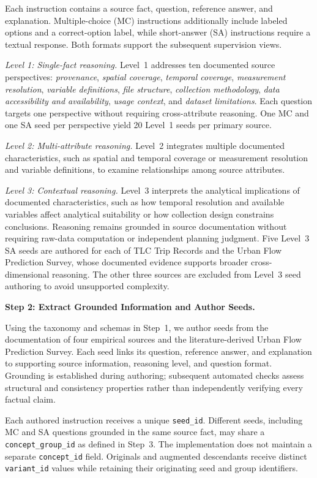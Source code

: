 \documentclass[a4paper,fleqn]{cas-sc}
\begin{document}
Each instruction contains a source fact, question, reference answer, and explanation. Multiple-choice (MC) instructions additionally include labeled options and a correct-option label, while short-answer (SA) instructions require a textual response. Both formats support the subsequent supervision views.

\textit{Level 1: Single-fact reasoning.}
Level~1 addresses ten documented source perspectives: \textit{provenance}, \textit{spatial coverage}, \textit{temporal coverage}, \textit{measurement resolution}, \textit{variable definitions}, \textit{file structure}, \textit{collection methodology}, \textit{data accessibility and availability}, \textit{usage context}, and \textit{dataset limitations}. Each question targets one perspective without requiring cross-attribute reasoning. One MC and one SA seed per perspective yield 20 Level~1 seeds per primary source.

\textit{Level 2: Multi-attribute reasoning.}
Level~2 integrates multiple documented characteristics, such as spatial and temporal coverage or measurement resolution and variable definitions, to examine relationships among source attributes.

\textit{Level 3: Contextual reasoning.}
Level~3 interprets the analytical implications of documented characteristics, such as how temporal resolution and available variables affect analytical suitability or how collection design constrains conclusions. Reasoning remains grounded in source documentation without requiring raw-data computation or independent planning judgment. Five Level~3 SA seeds are authored for each of TLC Trip Records and the Urban Flow Prediction Survey, whose documented evidence supports broader cross-dimensional reasoning. The other three sources are excluded from Level~3 seed authoring to avoid unsupported complexity.

\medskip
\noindent\textbf{Step 2: Extract Grounded Information and Author Seeds.}

Using the taxonomy and schemas in Step~1, we author seeds from the documentation of four empirical sources and the literature-derived Urban Flow Prediction Survey. Each seed links its question, reference answer, and explanation to supporting source information, reasoning level, and question format. Grounding is established during authoring; subsequent automated checks assess structural and consistency properties rather than independently verifying every factual claim.

Each authored instruction receives a unique \texttt{seed\_id}. Different seeds, including MC and SA questions grounded in the same source fact, may share a \texttt{concept\_group\_id} as defined in Step~3. The implementation does not maintain a separate \texttt{concept\_id} field. Originals and augmented descendants receive distinct \texttt{variant\_id} values while retaining their originating seed and group identifiers.
\end{document}
